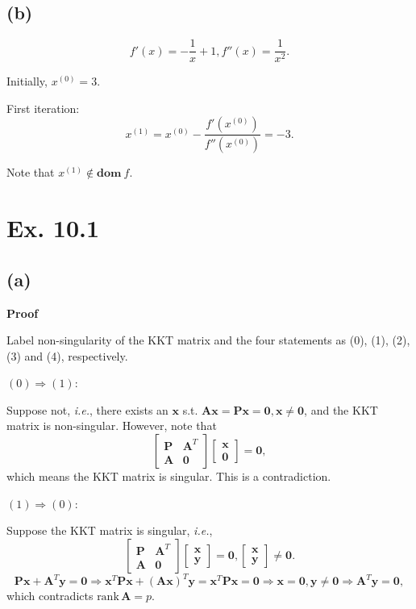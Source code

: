 \documentclass[12pt]{article}
\begin{document}
\subsection*{(b)}
$$f'(x)=-\dfrac{1}{x}+1,f''(x)=\dfrac{1}{x^2}.$$

Initially, $x^{(0)}=3$.

First iteration: $$x^{(1)}=x^{(0)}-\dfrac{f'(x^{(0)})}{f''(x^{(0)})}=-3.$$

Note that $x^{(1)}\notin \textbf{dom}\ f$.

\section*{Ex. 10.1}
\subsection*{(a)}
\textbf{Proof}

Label non-singularity of the KKT matrix and the four statements as (0), (1), (2), (3) and (4), respectively.

$(0)\Rightarrow(1)$:

Suppose not, \textit{i.e.}, there exists an $\bm{x}$ s.t. $\bm{Ax}=\bm{Px}=\bm{0}, \bm{x}\neq\bm{0}$, and the KKT matrix is non-singular. However, note that $$\left[\begin{matrix} \bm{P} & \bm{A}^T \\ \bm{A} & \bm{0} \end{matrix}\right]\left[\begin{matrix} \bm{x} \\ \bm{0} \end{matrix}\right]=\bm{0},$$ which means the KKT matrix is singular. This is a contradiction.

$(1)\Rightarrow(0)$:

Suppose the KKT matrix is singular, \textit{i.e.}, $$\left[\begin{matrix} \bm{P} & \bm{A}^T \\ \bm{A} & \bm{0} \end{matrix}\right]\left[\begin{matrix} \bm{x} \\ \bm{y} \end{matrix}\right]=\bm{0},\left[\begin{matrix} \bm{x} \\ \bm{y} \end{matrix}\right]\neq\bm{0}.$$ $$\bm{Px}+\bm{A}^T\bm{y}=\bm{0}\Rightarrow\bm{x}^T\bm{Px}+(\bm{Ax})^T\bm{y}=\bm{x}^T\bm{Px}=\bm{0}\Rightarrow\bm{x}=\bm{0},\bm{y}\neq\bm{0}\Rightarrow\bm{A}^T\bm{y}=\bm{0},$$ which contradicts $\text{rank}\,\bm{A}=p.$
\end{document}
